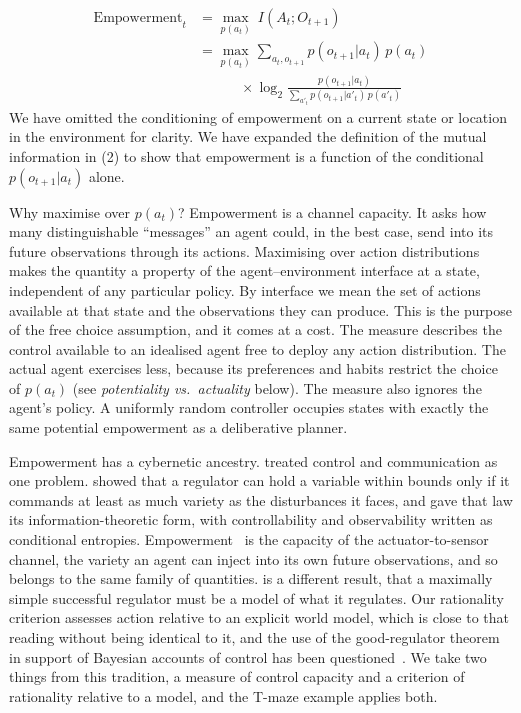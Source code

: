 \documentclass[pdflatex,sn-apa]{sn-jnl}%
\theoremstyle{definition}
\begin{document}
\begin{align}
\text{Empowerment}_t &= \underset{p(a_t)}{\max}\ I(A_t ; O_{t+1}) \\
 &= \underset{p(a_t)}{\max}\sum_{a_t, o_{t+1}} p(o_{t+1}|a_t)\, p(a_t) \nonumber\\
 &\qquad\quad \times \log_2 \frac{p(o_{t+1}|a_t)}{\sum_{a'_t} p(o_{t+1}|a'_t)\, p(a'_t)}
\end{align}
We have omitted the conditioning of empowerment on a current state or location in the environment for clarity. We have expanded the definition of the mutual information in (2) to show that empowerment is a function of the conditional $p(o_{t+1}|a_t)$ alone.

Why maximise over $p(a_t)$? Empowerment is a channel capacity. It asks how many distinguishable ``messages'' an agent could, in the best case, send into its future observations through its actions. Maximising over action distributions makes the quantity a property of the agent--environment interface at a state, independent of any particular policy. By interface we mean the set of actions available at that state and the observations they can produce. This is the purpose of the free choice assumption, and it comes at a cost. The measure describes the control available to an idealised agent free to deploy any action distribution. The actual agent exercises less, because its preferences and habits restrict the choice of $p(a_t)$ (see \emph{potentiality vs.\ actuality} below). The measure also ignores the agent's policy. A uniformly random controller occupies states with exactly the same potential empowerment as a deliberative planner.

Empowerment has a cybernetic ancestry. \citet{wienerCybernetics1948} treated control and communication as one problem. \citet{ashbyIntroductionCybernetics1956} showed that a regulator can hold a variable within bounds only if it commands at least as much variety as the disturbances it faces, and \citet{touchetteInformationTheoreticLimits2000,touchetteInformationTheoreticControl2004} gave that law its information-theoretic form, with controllability and observability written as conditional entropies. Empowerment~\citep{Klyubin2005empowerment,klyubinKeepYourOptions2008} is the capacity of the actuator-to-sensor channel, the variety an agent can inject into its own future observations, and so belongs to the same family of quantities. \citet{conantGoodRegulator1970} is a different result, that a maximally simple successful regulator must be a model of what it regulates. Our rationality criterion assesses action relative to an explicit world model, which is close to that reading without being identical to it, and the use of the good-regulator theorem in support of Bayesian accounts of control has been questioned~\citep{baltieriWattGovernors2020}. We take two things from this tradition, a measure of control capacity and a criterion of rationality relative to a model, and the T-maze example applies both.
\end{document}
